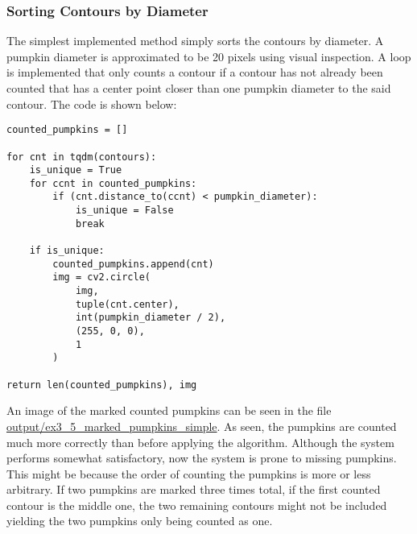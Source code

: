 \documentclass[../Head/Main.tex]{subfiles}
\begin{document}
\subsubsection{Sorting Contours by Diameter}\label{subsubsec:countFast}
The simplest implemented method simply sorts the contours by diameter. A pumpkin diameter is approximated to be 20 pixels using visual inspection. A loop is implemented that only counts a contour if a contour has not already been counted that has a center point closer than one pumpkin diameter to the said contour. The code is shown below:
\begin{verbatim}
counted_pumpkins = []

for cnt in tqdm(contours):
	is_unique = True
    for ccnt in counted_pumpkins:
    	if (cnt.distance_to(ccnt) < pumpkin_diameter):
        	is_unique = False
            break

    if is_unique:
        counted_pumpkins.append(cnt)
        img = cv2.circle(
        	img, 
            tuple(cnt.center), 
            int(pumpkin_diameter / 2), 
            (255, 0, 0), 
            1
       	)

return len(counted_pumpkins), img
\end{verbatim}
An image of the marked counted pumpkins can be seen in the file \url{output/ex3_5_marked_pumpkins_simple}. As seen, the pumpkins are counted much more correctly than before applying the algorithm. Although the system performs somewhat satisfactory, now the system is prone to missing pumpkins. This might be because the order of counting the pumpkins is more or less arbitrary. If two pumpkins are marked three times total, if the first counted contour is the middle one, the two remaining contours might not be included yielding the two pumpkins only being counted as one. 
\end{document}
